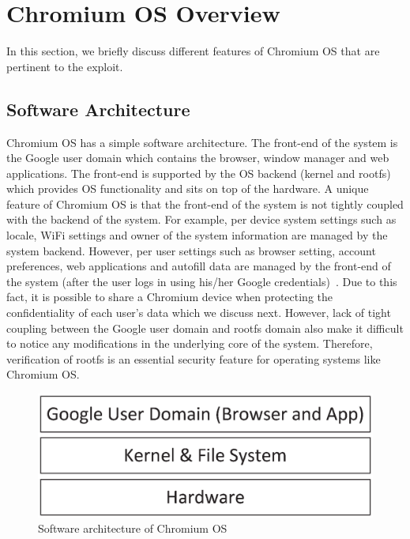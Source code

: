 \documentclass[11pt]{article}
\begin{document}
\section{Chromium OS Overview}

In this section, we briefly discuss different features of Chromium OS that are pertinent to the exploit. 
\subsection{Software Architecture}

Chromium OS has a simple software architecture. The front-end of the system is the Google user domain which contains the browser, window manager and web applications. The front-end is supported by the OS backend (kernel and rootfs) which provides OS functionality and sits on top of the hardware. A unique feature of Chromium OS is that the front-end of the system is not tightly coupled with the backend of the system. For example, per device system settings such as locale, WiFi settings and owner of the system information are managed by the system backend. However, per user settings such as browser setting, account preferences, web applications and autofill data are managed by the front-end of the system (after the user logs in using his/her Google credentials)~\cite{useraccount}. Due to this fact, it is possible to share a Chromium device when protecting the confidentiality of each user's data which we discuss next. However, lack of tight coupling between the Google user domain and rootfs domain also make it difficult to notice any modifications in the underlying core of the system. Therefore, verification of rootfs is an essential security feature for operating systems like Chromium OS. 
\begin{figure}[htbp]
  \centering
    \includegraphics[scale=0.5]{Figure/software-architecture.eps}
\caption{\small{Software architecture of Chromium OS}}
\label{fig:software-architecture}
\end{figure}
\end{document}
